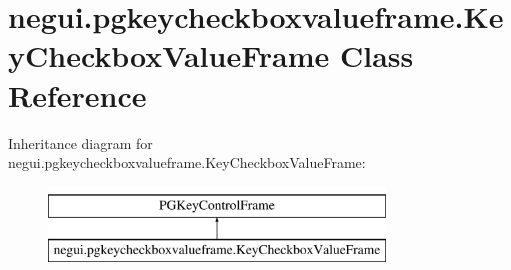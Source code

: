 \hypertarget{classnegui_1_1pgkeycheckboxvalueframe_1_1KeyCheckboxValueFrame}{}\section{negui.\+pgkeycheckboxvalueframe.\+Key\+Checkbox\+Value\+Frame Class Reference}
\label{classnegui_1_1pgkeycheckboxvalueframe_1_1KeyCheckboxValueFrame}
Inheritance diagram for negui.\+pgkeycheckboxvalueframe.\+Key\+Checkbox\+Value\+Frame\+:\begin{figure}[H]
\begin{center}
\leavevmode
\includegraphics[height=2.000000cm]{classnegui_1_1pgkeycheckboxvalueframe_1_1KeyCheckboxValueFrame}
\end{center}
\end{figure}
